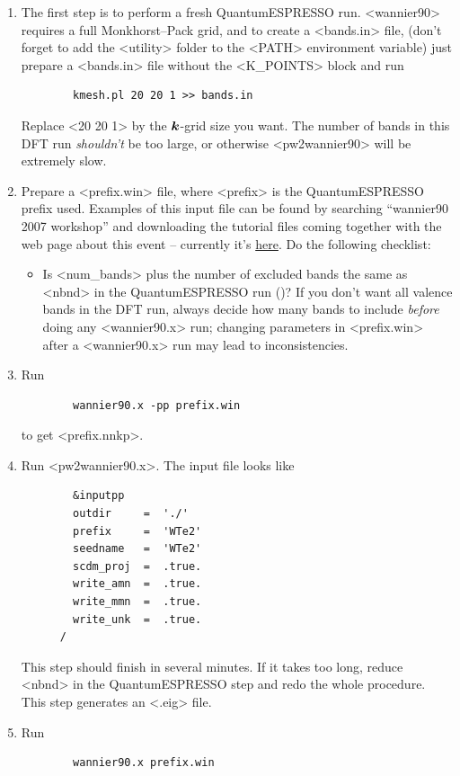 \documentclass[hyperref, a4paper]{report}
\def\texttt#1{<#1>}%
\newcommand{\shortcode}[1]{\texttt{#1}}
\begin{document}
\begin{enumerate}
    \item The first step is to perform a fresh QuantumESPRESSO run.
    \shortcode{wannier90} requires a full Monkhorst–Pack grid,
    and to create a \shortcode{bands.in} file, 
    (don't forget to add the \shortcode{utility} folder to the \shortcode{PATH} environment variable)
    just prepare a \shortcode{bands.in} file without the \shortcode{K_POINTS} block and run 
    \begin{lstlisting}
        kmesh.pl 20 20 1 >> bands.in
    \end{lstlisting}
    Replace \shortcode{20 20 1} by the $\vb*{k}$-grid size you want. 
    The number of bands in this DFT run \emph{shouldn't} be too large,
    or otherwise \shortcode{pw2wannier90} will be extremely slow. 
    \item Prepare a \shortcode{prefix.win} file, 
    where \shortcode{prefix} is the QuantumESPRESSO prefix used.
    Examples of this input file can be found by searching 
    ``wannier90 2007 workshop''
    and downloading the tutorial files coming together
    with the web page about this event -- 
    currently it's \href{http://www.wannier.org/events/cecampsi-k-tutorial-on-wannier90-lyon-2007/}{here}.
    Do the following checklist:
    \begin{itemize}
        \item Is \shortcode{num_bands} plus the number of excluded bands 
        the same as \shortcode{nbnd} in the QuantumESPRESSO run
        ()?
        If you don't want all valence bands in the DFT run, 
        always decide how many bands to include \emph{before} doing any \shortcode{wannier90.x} run;
        changing parameters in \shortcode{prefix.win}
        after a \shortcode{wannier90.x} run may lead to inconsistencies.
    \end{itemize}
    \item Run
    \begin{lstlisting}
        wannier90.x -pp prefix.win
    \end{lstlisting}
    to get \shortcode{prefix.nnkp}.
    \item Run \shortcode{pw2wannier90.x}.
    The input file looks like 
    \begin{lstlisting}
        &inputpp
        outdir     =  './'
        prefix     =  'WTe2'
        seedname   =  'WTe2'
        scdm_proj  =  .true.
        write_amn  =  .true.                                                        
        write_mmn  =  .true.
        write_unk  =  .true.
      /
    \end{lstlisting}
    This step should finish in several minutes.
    If it takes too long, 
    reduce \shortcode{nbnd} in the QuantumESPRESSO step 
    and redo the whole procedure.
    This step generates an \shortcode{.eig} file.
    \item Run 
    \begin{lstlisting}
        wannier90.x prefix.win
    \end{lstlisting}
\end{enumerate}
\end{document}
